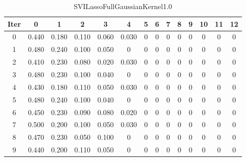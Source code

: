 \begin{table}
	\begin{center}
		\begin{tabular}{|c|c|c|c|c|c|c|c|c|c|c|c|c|c|}
			\hline
			Iter & 0 & 1 & 2 & 3 & 4 & 5 & 6 & 7 & 8 & 9 & 10 & 11 & 12 \\
			\hline
			0 & 0.440 & 0.180 & 0.110 & 0.060 & 0.030 & 0 & 0 & 0 & 0 & 0 & 0 & 0 & 0 \\
			\hline
			1 & 0.480 & 0.240 & 0.100 & 0.050 & 0 & 0 & 0 & 0 & 0 & 0 & 0 & 0 & 0 \\
			\hline
			2 & 0.410 & 0.230 & 0.080 & 0.020 & 0.030 & 0 & 0 & 0 & 0 & 0 & 0 & 0 & 0 \\
			\hline
			3 & 0.480 & 0.230 & 0.100 & 0.040 & 0 & 0 & 0 & 0 & 0 & 0 & 0 & 0 & 0 \\
			\hline
			4 & 0.430 & 0.180 & 0.110 & 0.050 & 0.030 & 0 & 0 & 0 & 0 & 0 & 0 & 0 & 0 \\
			\hline
			5 & 0.480 & 0.240 & 0.100 & 0.040 & 0 & 0 & 0 & 0 & 0 & 0 & 0 & 0 & 0 \\
			\hline
			6 & 0.450 & 0.230 & 0.090 & 0.080 & 0.020 & 0 & 0 & 0 & 0 & 0 & 0 & 0 & 0 \\
			\hline
			7 & 0.500 & 0.200 & 0.100 & 0.050 & 0.030 & 0 & 0 & 0 & 0 & 0 & 0 & 0 & 0 \\
			\hline
			8 & 0.470 & 0.230 & 0.050 & 0.100 & 0 & 0 & 0 & 0 & 0 & 0 & 0 & 0 & 0 \\
			\hline
			9 & 0.440 & 0.200 & 0.110 & 0.050 & 0 & 0 & 0 & 0 & 0 & 0 & 0 & 0 & 0 \\
			\hline
		\end{tabular}
	\end{center}
	\caption{SVILassoFullGaussianKernel1.0}
\end{table}